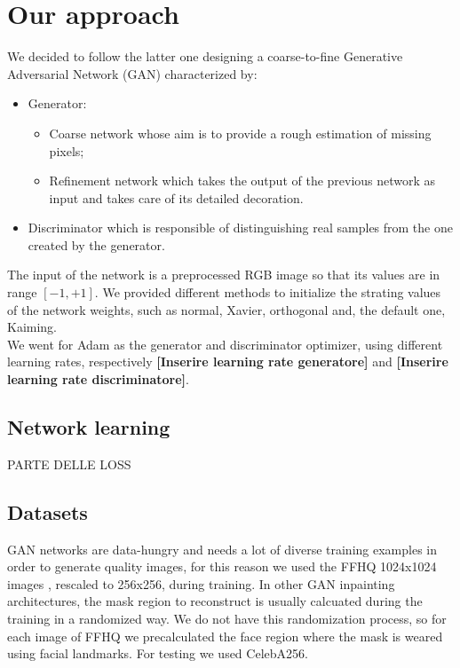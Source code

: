 \documentclass[10pt,twocolumn,letterpaper]{article}
\begin{document}
	\section{Our approach}
	We decided to follow the latter one designing a coarse-to-fine Generative Adversarial Network (GAN) characterized by:
	\begin{itemize}
		\item
		Generator:
		\begin{itemize}
			\item 
			Coarse network whose aim is to provide a rough estimation of missing pixels;
			\item
			Refinement network which takes the output of the previous network as input and takes care of its detailed decoration.
		\end{itemize}
		\item
		Discriminator which is responsible of distinguishing real samples from the one created by the generator.
	\end{itemize}
	The input of the network is a preprocessed RGB image so that its values are in range \([-1,+1]\).
	We provided different methods to initialize the strating values of the network weights, such as normal, Xavier, orthogonal and, the default one, Kaiming.
	\\
	We went for Adam as the generator and discriminator optimizer, using different learning rates, respectively \textbf{[Inserire learning rate generatore]} and \textbf{[Inserire learning rate discriminatore]}.
	\subsection{Network learning}
	PARTE DELLE LOSS
	\subsection{Datasets}
	GAN networks are data-hungry and needs a lot of diverse training examples in
	order to generate quality images, for this reason we used the FFHQ 1024x1024
	images \cite{karras2019style}, rescaled to 256x256, during training.  In other GAN inpainting
	architectures, the mask region to reconstruct is usually calcuated during the
	training in a randomized way.  We do not have this randomization process, so for
	each image of FFHQ we precalculated the face region where the mask is weared
	using facial landmarks.  For testing we used CelebA256.
	
\end{document}
